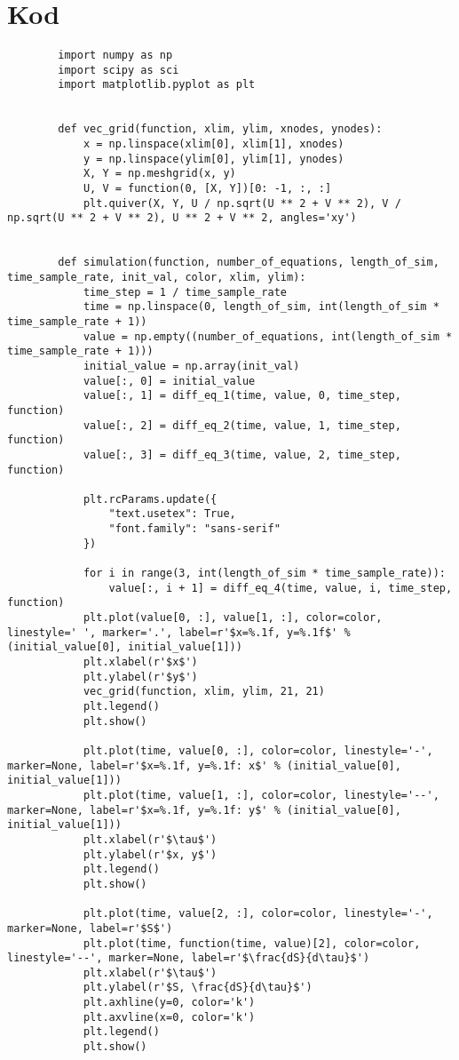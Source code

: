 \documentclass[10pt, a4paper, twoside, onecolumn]{article}
\numberwithin{equation}{section}
\begin{document}
	\section{Kod}
	\begin{verbatim}
		import numpy as np
		import scipy as sci
		import matplotlib.pyplot as plt
		
		
		def vec_grid(function, xlim, ylim, xnodes, ynodes):
		    x = np.linspace(xlim[0], xlim[1], xnodes)
		    y = np.linspace(ylim[0], ylim[1], ynodes)
		    X, Y = np.meshgrid(x, y)
		    U, V = function(0, [X, Y])[0: -1, :, :]
		    plt.quiver(X, Y, U / np.sqrt(U ** 2 + V ** 2), V / np.sqrt(U ** 2 + V ** 2), U ** 2 + V ** 2, angles='xy')
		
		
		def simulation(function, number_of_equations, length_of_sim, time_sample_rate, init_val, color, xlim, ylim):
		    time_step = 1 / time_sample_rate
		    time = np.linspace(0, length_of_sim, int(length_of_sim * time_sample_rate + 1))
		    value = np.empty((number_of_equations, int(length_of_sim * time_sample_rate + 1)))
		    initial_value = np.array(init_val)
		    value[:, 0] = initial_value
		    value[:, 1] = diff_eq_1(time, value, 0, time_step, function)
		    value[:, 2] = diff_eq_2(time, value, 1, time_step, function)
		    value[:, 3] = diff_eq_3(time, value, 2, time_step, function)
		
		    plt.rcParams.update({
		        "text.usetex": True,
		        "font.family": "sans-serif"
		    })
		
		    for i in range(3, int(length_of_sim * time_sample_rate)):
		        value[:, i + 1] = diff_eq_4(time, value, i, time_step, function)
		    plt.plot(value[0, :], value[1, :], color=color, linestyle=' ', marker='.', label=r'$x=%.1f, y=%.1f$' % (initial_value[0], initial_value[1]))
		    plt.xlabel(r'$x$')
		    plt.ylabel(r'$y$')
		    vec_grid(function, xlim, ylim, 21, 21)
		    plt.legend()
		    plt.show()
		
		    plt.plot(time, value[0, :], color=color, linestyle='-', marker=None, label=r'$x=%.1f, y=%.1f: x$' % (initial_value[0], initial_value[1]))
		    plt.plot(time, value[1, :], color=color, linestyle='--', marker=None, label=r'$x=%.1f, y=%.1f: y$' % (initial_value[0], initial_value[1]))
		    plt.xlabel(r'$\tau$')
		    plt.ylabel(r'$x, y$')
		    plt.legend()
		    plt.show()
		
		    plt.plot(time, value[2, :], color=color, linestyle='-', marker=None, label=r'$S$')
		    plt.plot(time, function(time, value)[2], color=color, linestyle='--', marker=None, label=r'$\frac{dS}{d\tau}$')
		    plt.xlabel(r'$\tau$')
		    plt.ylabel(r'$S, \frac{dS}{d\tau}$')
		    plt.axhline(y=0, color='k')
		    plt.axvline(x=0, color='k')
		    plt.legend()
		    plt.show()



\end{verbatim}
\end{document}
